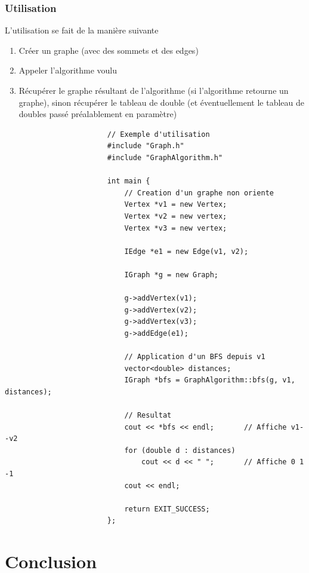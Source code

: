 \documentclass[french]{article}
\begin{document}
			\subsubsection{Utilisation}
			L'utilisation se fait de la manière suivante
			\begin{enumerate}
				\item Créer un graphe (avec des sommets et des edges) 
				\item Appeler l'algorithme voulu
				\item Récupérer le graphe résultant de l'algorithme (si l'algorithme retourne un graphe), sinon récupérer le tableau de double (et éventuellement le tableau de doubles passé préalablement en paramètre)
			\end{enumerate}
			
			\begin{lstlisting}
						// Exemple d'utilisation
						#include "Graph.h"
						#include "GraphAlgorithm.h"
						
						int main {				
							// Creation d'un graphe non oriente
							Vertex *v1 = new Vertex;
							Vertex *v2 = new vertex;
							Vertex *v3 = new vertex;
							
							IEdge *e1 = new Edge(v1, v2);
							
							IGraph *g = new Graph;
							
							g->addVertex(v1);
							g->addVertex(v2);
							g->addVertex(v3);
							g->addEdge(e1);
							
							// Application d'un BFS depuis v1
							vector<double> distances;
							IGraph *bfs = GraphAlgorithm::bfs(g, v1, distances);
							
							// Resultat
							cout << *bfs << endl;		// Affiche v1--v2
							for (double d : distances)	
								cout << d << " ";		// Affiche 0 1 -1
							cout << endl;
							
							return EXIT_SUCCESS;
						};
			\end{lstlisting}
			


	\section{Conclusion}
	
\end{document}
